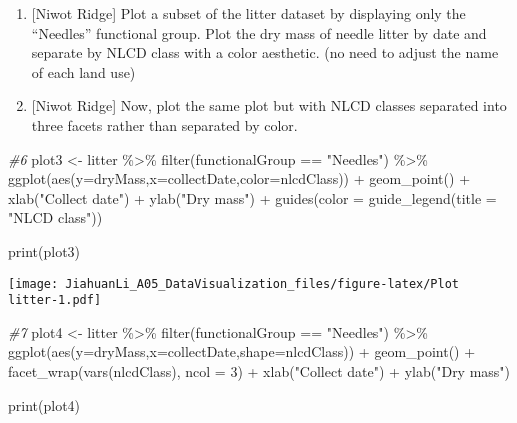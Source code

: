 \documentclass[
]{article}
\newenvironment{Shaded}{\begin{snugshade}}{\end{snugshade}}
\newcommand{\AttributeTok}[1]{\textcolor[rgb]{0.77,0.63,0.00}{#1}}
\newcommand{\CommentTok}[1]{\textcolor[rgb]{0.56,0.35,0.01}{\textit{#1}}}
\newcommand{\DecValTok}[1]{\textcolor[rgb]{0.00,0.00,0.81}{#1}}
\newcommand{\FunctionTok}[1]{\textcolor[rgb]{0.00,0.00,0.00}{#1}}
\newcommand{\NormalTok}[1]{#1}
\newcommand{\OtherTok}[1]{\textcolor[rgb]{0.56,0.35,0.01}{#1}}
\newcommand{\SpecialCharTok}[1]{\textcolor[rgb]{0.00,0.00,0.00}{#1}}
\newcommand{\StringTok}[1]{\textcolor[rgb]{0.31,0.60,0.02}{#1}}
\begin{document}
\begin{enumerate}
\def\labelenumi{\arabic{enumi}.}
\setcounter{enumi}{5}
\item
  {[}Niwot Ridge{]} Plot a subset of the litter dataset by displaying
  only the ``Needles'' functional group. Plot the dry mass of needle
  litter by date and separate by NLCD class with a color aesthetic. (no
  need to adjust the name of each land use)
\item
  {[}Niwot Ridge{]} Now, plot the same plot but with NLCD classes
  separated into three facets rather than separated by color.
\end{enumerate}

\begin{Shaded}
\begin{Highlighting}[]
\CommentTok{\#6}
\NormalTok{plot3 }\OtherTok{\textless{}{-}}\NormalTok{ litter }\SpecialCharTok{\%\textgreater{}\%}
  \FunctionTok{filter}\NormalTok{(functionalGroup }\SpecialCharTok{==} \StringTok{"Needles"}\NormalTok{) }\SpecialCharTok{\%\textgreater{}\%}
  \FunctionTok{ggplot}\NormalTok{(}\FunctionTok{aes}\NormalTok{(}\AttributeTok{y=}\NormalTok{dryMass,}\AttributeTok{x=}\NormalTok{collectDate,}\AttributeTok{color=}\NormalTok{nlcdClass)) }\SpecialCharTok{+}
  \FunctionTok{geom\_point}\NormalTok{() }\SpecialCharTok{+} 
  \FunctionTok{xlab}\NormalTok{(}\StringTok{"Collect date"}\NormalTok{) }\SpecialCharTok{+}
  \FunctionTok{ylab}\NormalTok{(}\StringTok{"Dry mass"}\NormalTok{) }\SpecialCharTok{+}
  \FunctionTok{guides}\NormalTok{(}\AttributeTok{color =} \FunctionTok{guide\_legend}\NormalTok{(}\AttributeTok{title =} \StringTok{"NLCD class"}\NormalTok{))}

\FunctionTok{print}\NormalTok{(plot3)}
\end{Highlighting}
\end{Shaded}

\texttt{[image: JiahuanLi\_A05\_DataVisualization\_files/figure-latex/Plot litter-1.pdf]}

\begin{Shaded}
\begin{Highlighting}[]
\CommentTok{\#7}
\NormalTok{plot4 }\OtherTok{\textless{}{-}}\NormalTok{ litter }\SpecialCharTok{\%\textgreater{}\%}
  \FunctionTok{filter}\NormalTok{(functionalGroup }\SpecialCharTok{==} \StringTok{"Needles"}\NormalTok{) }\SpecialCharTok{\%\textgreater{}\%}
  \FunctionTok{ggplot}\NormalTok{(}\FunctionTok{aes}\NormalTok{(}\AttributeTok{y=}\NormalTok{dryMass,}\AttributeTok{x=}\NormalTok{collectDate,}\AttributeTok{shape=}\NormalTok{nlcdClass)) }\SpecialCharTok{+}
  \FunctionTok{geom\_point}\NormalTok{() }\SpecialCharTok{+}
  \FunctionTok{facet\_wrap}\NormalTok{(}\FunctionTok{vars}\NormalTok{(nlcdClass), }\AttributeTok{ncol =} \DecValTok{3}\NormalTok{) }\SpecialCharTok{+}
  \FunctionTok{xlab}\NormalTok{(}\StringTok{"Collect date"}\NormalTok{) }\SpecialCharTok{+}
  \FunctionTok{ylab}\NormalTok{(}\StringTok{"Dry mass"}\NormalTok{)}


\FunctionTok{print}\NormalTok{(plot4)}
\end{Highlighting}
\end{Shaded}
\end{document}
